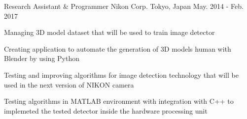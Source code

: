 \begin{cventries}
  \cventry
	{Research Assistant \& Programmer} %
    {Nikon Corp.} %
    {Tokyo, Japan} %
    {May. 2014 - Feb. 2017} %
    {
      \begin{cvitems} %
        \item {Managing 3D model dataset that will be used to train image detector}
        \item {Creating application to automate the generation of 3D models human with Blender by using Python}
        \item {Testing and improving algorithms for image detection technology that will be used in the next version of NIKON camera}
        \item {Testing algorithms in MATLAB environment with integration with C++ to implemeted the tested detector inside the hardware processing unit}
      \end{cvitems}
    }
%
\end{cventries}
